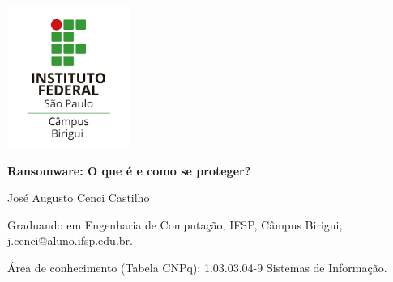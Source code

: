 \begin{flushright}
  \includegraphics[width=4cm]{imagens/logo_ifsp_bri.png}
\end{flushright}




\begin{center}

\vspace{0.5cm}
 \begin{center}
 \textbf{Ransomware: O que é e como se proteger?}
 \end{center}

\vspace{0.5cm}
José Augusto Cenci Castilho

\begingroup
  \fontsize{9pt}{11pt}\selectfont
  
  Graduando em Engenharia de Computação, IFSP, Câmpus Birigui, j.cenci@aluno.ifsp.edu.br.

Área de conhecimento (Tabela CNPq): 1.03.03.04-9 Sistemas de Informação. 
\endgroup

\end{center}
